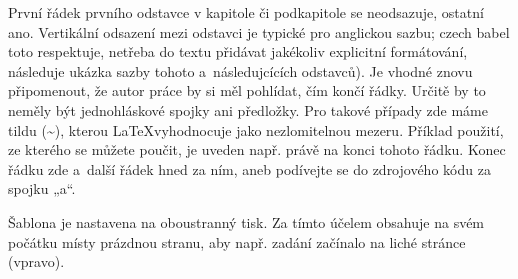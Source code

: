 

První řádek prvního odstavce v kapitole či podkapitole se neodsazuje, ostatní ano. Vertikální odsazení mezi odstavci je typické pro anglickou sazbu; czech babel toto respektuje, netřeba do textu přidávat jakékoliv explicitní formátování, následuje ukázka sazby tohoto a~následujcících odstavců). Je vhodné znovu připomenout, že autor práce by si měl pohlídat, čím končí řádky. Určitě by to neměly být jednohláskové spojky ani předložky. Pro takové případy zde máme tildu (\textasciitilde), kterou \LaTeX vyhodnocuje jako nezlomitelnou mezeru. Příklad použití, ze kterého se můžete poučit, je uveden např. právě na konci tohoto řádku. Konec řádku zde a~další řádek hned za ním, aneb podívejte se do zdrojového kódu za spojku „a“.

Šablona je nastavena na oboustranný tisk. Za tímto účelem obsahuje na svém počátku místy prázdnou stranu, aby např. zadání začínalo na liché stránce (vpravo).


